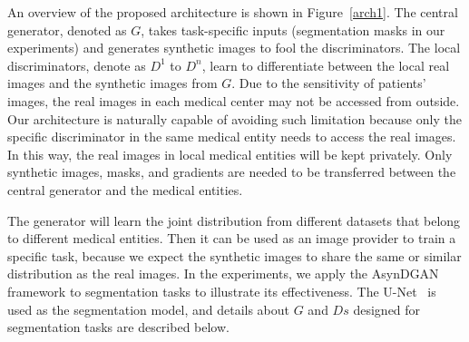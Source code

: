 
An overview of the proposed architecture is shown in Figure~\ref{arch1}.
The central generator, denoted as $G$, takes task-specific inputs (segmentation masks in our experiments) and generates synthetic images to fool the discriminators. The local discriminators, denote as $D^1$ to $D^n$, learn to differentiate between the local real images and the synthetic images from $G$. 
Due to the sensitivity of patients' images, the real images in each medical center may not be accessed from outside. Our architecture is naturally capable of avoiding such limitation because only the specific discriminator in the same medical entity needs to access the real images. In this way, the real images in local medical entities will be kept privately. Only synthetic images, masks, and gradients are needed to be transferred between the central generator and the medical entities. 

The generator will learn the joint distribution from different datasets that belong to different medical entities. Then it can be used as an image provider to train a specific task, because we expect the synthetic images to share the same or similar distribution as the real images. In the experiments, we apply the AsynDGAN framework to segmentation tasks to illustrate its effectiveness. The U-Net~\cite{ronneberger2015u} is used as the segmentation model, and details about $G$ and $Ds$ designed for segmentation tasks are described below.



